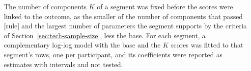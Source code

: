 The number of components $K$ of a segment was fixed before the scores were linked to the outcome, as the smaller of the number of components that passed [rule] and the largest number of parameters the segment supports by the criteria of Section~\ref{sec:tech-sample-size}, less the base.
For each segment, a complementary log-log model with the base and the $K$ scores was fitted to that segment's rows, one per participant, and its coefficients were reported as estimates with intervals and not tested.
